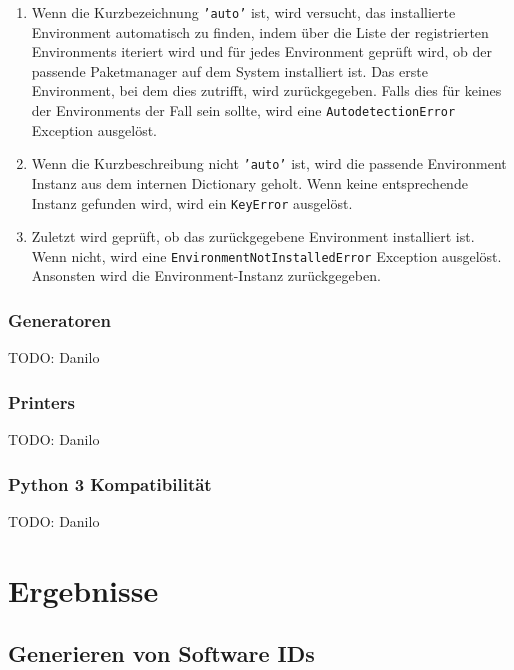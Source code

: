 \begin{enumerate}
	\item Wenn die Kurzbezeichnung \texttt{'auto'} ist, wird versucht, das
	installierte Environment automatisch zu finden, indem über die Liste der
	registrierten Environments iteriert wird und für jedes Environment geprüft
	wird, ob der passende Paketmanager auf dem System installiert ist. Das erste
	Environment, bei dem dies zutrifft, wird zurückgegeben. Falls dies für keines
	der Environments der Fall sein sollte, wird eine \texttt{AutodetectionError}
	Exception ausgelöst.
	
	\item Wenn die Kurzbeschreibung nicht \texttt{'auto'} ist, wird die passende
	Environment Instanz aus dem internen Dictionary geholt. Wenn keine
	entsprechende Instanz gefunden wird, wird ein \texttt{KeyError} ausgelöst.
		
	\item Zuletzt wird geprüft, ob das zurückgegebene Environment installiert
	ist. Wenn nicht, wird eine \texttt{EnvironmentNotInstalledError} Exception
	ausgelöst. Ansonsten wird die Environment-Instanz zurückgegeben.
\end{enumerate}

\subsubsection{Generatoren}
\label{swidgenerator:architektur:generatoren}
TODO: Danilo

\subsubsection{Printers}
\label{swidgenerator:architektur:printers}
TODO: Danilo

\subsubsection{Python 3 Kompatibilität}
TODO: Danilo



\section{Ergebnisse}

\subsection{Generieren von Software IDs}


